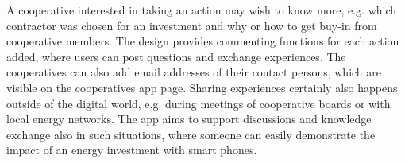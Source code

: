 A cooperative interested in taking an action may wish to know more, e.g. which contractor was chosen for an investment and why or how to get buy-in from cooperative members. The design provides commenting functions for each action added, where users can post questions and exchange experiences. The cooperatives can also add email addresses of their contact persons, which are visible on the cooperatives app page.
% 
Sharing experiences certainly also happens outside of the digital world, e.g. during meetings of cooperative boards or with local energy networks. The app aims  to support discussions and knowledge exchange also in such situations, where someone can easily demonstrate the impact of an energy investment with smart phones.

%

